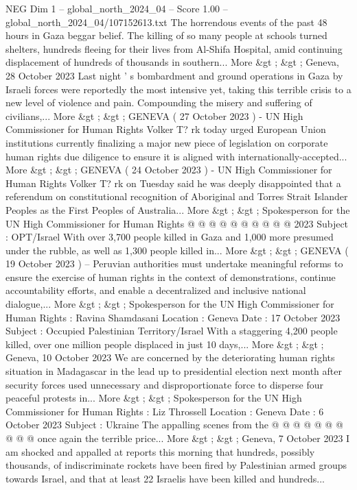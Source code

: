 \begin{textsample}{NEG Dim 1 – global\_north\_2024\_04 – Score 1.00 – global\_north\_2024\_04/107152613.txt}  \label{ex:f1_neg_305}
The horrendous events of the past 48 hours in Gaza beggar belief.
The killing of so many people at schools turned shelters, hundreds fleeing for their lives from Al-Shifa Hospital, amid continuing displacement of hundreds of thousands in southern...
More \&gt ; \&gt ; Geneva, 28 October 2023 Last night ' s bombardment and ground operations in Gaza by Israeli forces were reportedly the most intensive yet, taking this terrible crisis to a new level of violence and pain.
Compounding the misery and suffering of civilians,...
More \&gt ; \&gt ; GENEVA ( 27 October 2023 ) - UN High Commissioner for Human Rights Volker T? rk today urged European Union institutions currently finalizing a major new piece of legislation on corporate human rights due diligence to ensure it is aligned with internationally-accepted...
More \&gt ; \&gt ; GENEVA ( 24 October 2023 ) - UN High Commissioner for Human Rights Volker T? rk on Tuesday said he was deeply disappointed that a referendum on constitutional recognition of Aboriginal and Torres Strait Islander Peoples as the First Peoples of Australia...
More \&gt ; \&gt ; Spokesperson for the UN High Commissioner for Human Rights @ @ @ @ @ @ @ @ @ @ 2023 Subject : OPT/Israel With over 3,700 people killed in Gaza and 1,000 more presumed under the rubble, as well as 1,300 people killed in...
More \&gt ; \&gt ; GENEVA ( 19 October 2023 ) -- Peruvian authorities must undertake meaningful reforms to ensure the exercise of human rights in the context of demonstrations, continue accountability efforts, and enable a decentralized and inclusive national dialogue,...
More \&gt ; \&gt ; Spokesperson for the UN High Commissioner for Human Rights : Ravina Shamdasani Location : Geneva Date : 17 October 2023 Subject : Occupied Palestinian Territory/Israel With a staggering 4,200 people killed, over one million people displaced in just 10 days,...
More \&gt ; \&gt ; Geneva, 10 October 2023 We are concerned by the deteriorating human rights situation in Madagascar in the lead up to presidential election next month after security forces used unnecessary and disproportionate force to disperse four peaceful protests in...
More \&gt ; \&gt ; Spokesperson for the UN High Commissioner for Human Rights : Liz Throssell Location : Geneva Date : 6 October 2023 Subject : Ukraine The appalling scenes from the @ @ @ @ @ @ @ @ @ @ once again the terrible price...
More \&gt ; \&gt ; Geneva, 7 October 2023 I am shocked and appalled at reports this morning that hundreds, possibly thousands, of indiscriminate rockets have been fired by Palestinian armed groups towards Israel, and that at least 22 Israelis have been killed and hundreds...

\end{textsample}
